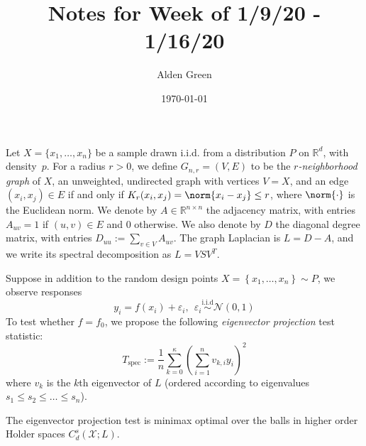 \documentclass{article}
\newcommand{\Reals}{\mathbb{R}}
\newcommand{\set}[1]{\left\{#1\right\}}
\newcommand{\1}{\mathbf{1}}
\newcommand{\Rd}{\Reals^d}
\newcommand{\Xset}{\mathcal{X}}
\theoremstyle{alden}
\theoremstyle{aldenthm}
\theoremstyle{definition}
\theoremstyle{remark}
\begin{document}
	\title{Notes for Week of 1/9/20 - 1/16/20}
	\author{Alden Green}
	\date{\today}
	\maketitle
	
	Let $X = \{x_1,
	\ldots, x_n\}$ be a sample drawn i.i.d. from a distribution $P$ on $\Rd$,
	with density~$p$.  For a radius $r > 0$, we define $G_{n,r}=(V,E)$ to be the
	\emph{$r$-neighborhood graph} of $X$, an unweighted, undirected graph with
	vertices $V=X$, and an edge $(x_i,x_j) \in E$ if and only if $K_r(x_i,x_j) = \norm{x_i -x_j} \leq r$, where $\norm{\cdot}$ is the Euclidean norm. We denote by $A \in
	\Reals^{n \times n}$ the adjacency matrix, with entries $A_{uv} = 1$ if
	$(u,v) \in E$ and $0$ otherwise.  We also denote by $D$ the diagonal degree
	matrix, with entries $D_{uu} := \sum_{v \in V} A_{uv}$. The graph Laplacian is $L = D - A$, and we write its spectral decomposition as $L = V S V^T$. 
	
	Suppose in addition to the random design points $X = \set{x_1,\ldots,x_n} \sim P$, we observe responses
	\begin{equation}
	\label{eqn:regression_known_variance}
	y_i = f(x_i) + \varepsilon_i, ~~ \varepsilon_i \overset{\textrm{i.i.d}}{\sim} \mathcal{N}(0,1)
	\end{equation} 
	To test whether $f = f_0$, we propose the following \emph{eigenvector projection} test statistic:
	\begin{equation}
	\label{eqn:graph_spectral_projections}
	T_{\mathrm{spec}} := \frac{1}{n} \sum_{k = 0}^{\kappa} \left(\sum_{i = 1}^{n} v_{k,i} y_i\right)^2
	\end{equation}
	where $v_k$ is the $k$th eigenvector of $L$ (ordered according to eigenvalues $s_1 \leq s_2 \leq \ldots \leq s_n$).
	
	The eigenvector projection test is minimax optimal over the balls in higher order Holder spaces $C_d^s(\Xset;L)$.
	
\end{document}
